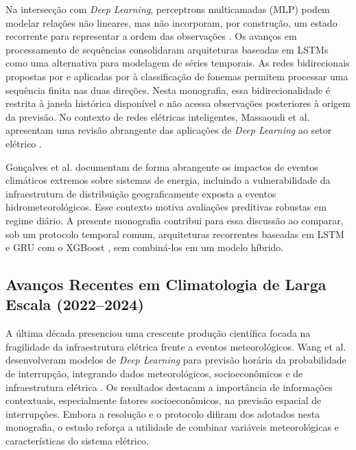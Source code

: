 Na intersecção com \textit{Deep Learning}, perceptrons multicamadas (MLP) podem modelar relações não lineares, mas não incorporam, por construção, um estado recorrente para representar a ordem das observações \cite{goodfellow2016deep, lecun2015deep}. Os avanços em processamento de sequências \cite{wang2018deep, cho2014learning} consolidaram arquiteturas baseadas em LSTMs \cite{hochreiter1997long} como uma alternativa para modelagem de séries temporais. As redes bidirecionais propostas por \cite{schuster1997bidirectional} e aplicadas por \cite{graves2005framewise} à classificação de fonemas permitem processar uma sequência finita nas duas direções. Nesta monografia, essa bidirecionalidade é restrita à janela histórica disponível e não acessa observações posteriores à origem da previsão. No contexto de redes elétricas inteligentes, Massaoudi et al. apresentam uma revisão abrangente das aplicações de \textit{Deep Learning} ao setor elétrico \cite{ho2016deep}.

Gonçalves et al. \cite{gomes2020impact} documentam de forma abrangente os impactos de eventos climáticos extremos sobre sistemas de energia, incluindo a vulnerabilidade da infraestrutura de distribuição geograficamente exposta a eventos hidrometeorológicos. Esse contexto motiva avaliações preditivas robustas em regime diário. A presente monografia contribui para essa discussão ao comparar, sob um protocolo temporal comum, arquiteturas recorrentes baseadas em LSTM e GRU \cite{cho2014learning} com o XGBoost \cite{chen2016xgboost}, sem combiná-los em um modelo híbrido.

\subsection{Avanços Recentes em Climatologia de Larga Escala (2022--2024)}

A última década presenciou uma crescente produção científica focada na fragilidade da infraestrutura elétrica frente a eventos meteorológicos. Wang et al. desenvolveram modelos de \textit{Deep Learning} para previsão horária da probabilidade de interrupção, integrando dados meteorológicos, socioeconômicos e de infraestrutura elétrica \cite{zhang2023deep}. Os resultados destacam a importância de informações contextuais, especialmente fatores socioeconômicos, na previsão espacial de interrupções. Embora a resolução e o protocolo difiram dos adotados nesta monografia, o estudo reforça a utilidade de combinar variáveis meteorológicas e características do sistema elétrico.

